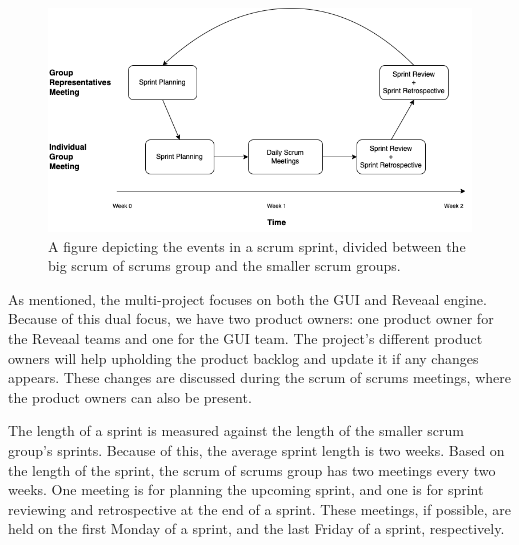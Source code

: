 \begin{figure}[H]
    \centering
    \includegraphics[width=\textwidth]{common/figures/Scrum_of_scrums_schedule.png}
    \caption{A figure depicting the events in a scrum sprint, divided between the big scrum of scrums group and the smaller scrum groups.}
    \label{fig:scrum-of-scrums-events}
\end{figure}


As mentioned, the multi-project focuses on both the GUI and Reveaal engine.
Because of this dual focus, we have two product owners: one product owner for the Reveaal teams and one for the GUI team.
The project's different product owners will help upholding the product backlog and update it if any changes appears. 
These changes are discussed during the scrum of scrums meetings, where the product owners can also be present.

The length of a sprint is measured against the length of the smaller scrum group's sprints.
Because of this, the average sprint length is two weeks.
Based on the length of the sprint, the scrum of scrums group has two meetings every two weeks. 
One meeting is for planning the upcoming sprint, and one is for sprint reviewing and retrospective at the end of a sprint.
These meetings, if possible, are held on the first Monday of a sprint, and the last Friday of a sprint, respectively.




